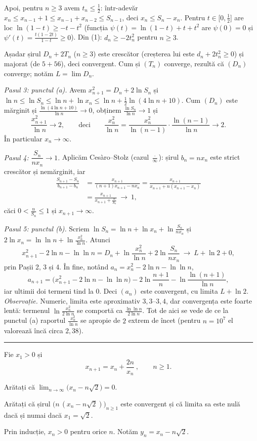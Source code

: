 Apoi, pentru $n\ge3$ avem $t_n\le\frac12$: într-adevăr $x_n\le x_{n-1}+1\le x_{n-1}+x_{n-2}\le S_{n-1}$, deci $x_n\le S_n-x_n$. Pentru $t\in\bigl[0,\frac12\bigr]$ are loc $\ln(1-t)\ge-t-t^2$ (funcția $\psi(t)=\ln(1-t)+t+t^2$ are $\psi(0)=0$ și $\psi'(t)=\frac{t(1-2t)}{1-t}\ge0$). Din (1): $d_n\ge-2t_n^2$ pentru $n\ge3$.

Așadar șirul $D_n+2T_n$ ($n\ge3$) este crescător (creșterea lui este $d_n+2t_n^2\ge0$) și majorat (de $5+56$), deci convergent. Cum și $(T_n)$ converge, rezultă că $(D_n)$ converge; notăm $L=\lim D_n$.

\emph{Pasul 3: punctul (a).} Avem $x_{n+1}^2=D_n+2\ln S_n$ și $\ln n\le\ln S_n\le\ln n+\ln x_n\le\ln n+\frac12\ln(4\ln n+10)$. Cum $(D_n)$ este mărginit și $\frac{\ln(4\ln n+10)}{\ln n}\to0$, obținem $\frac{\ln S_n}{\ln n}\to1$ și
\[ \frac{x_{n+1}^2}{\ln n}\to2 ,\qquad\text{deci}\qquad \frac{x_n^2}{\ln n}=\frac{x_n^2}{\ln(n-1)}\cdot\frac{\ln(n-1)}{\ln n}\to2 . \]
În particular $x_n\to\infty$.

\emph{Pasul 4: $\dfrac{S_n}{nx_n}\to1$.} Aplicăm Cesàro--Stolz (cazul $\frac{\cdot}{\infty}$): șirul $b_n=nx_n$ este strict crescător și nemărginit, iar
\[ \begin{aligned} \frac{S_{n+1}-S_n}{b_{n+1}-b_n}&=\frac{x_{n+1}}{(n+1)x_{n+1}-nx_n}=\frac{x_{n+1}}{x_{n+1}+n(x_{n+1}-x_n)}\\ &=\frac{x_{n+1}}{x_{n+1}+\frac{n}{S_n}}\ \longrightarrow\ 1, \end{aligned} \]
căci $0<\frac n{S_n}\le1$ și $x_{n+1}\to\infty$.

\emph{Pasul 5: punctul (b).} Scriem $\ln S_n=\ln n+\ln x_n+\ln\frac{S_n}{nx_n}$ și $2\ln x_n=\ln\ln n+\ln\frac{x_n^2}{\ln n}$. Atunci
\[ x_{n+1}^2-2\ln n-\ln\ln n=D_n+\ln\frac{x_n^2}{\ln n}+2\ln\frac{S_n}{nx_n}\ \longrightarrow\ L+\ln2+0 , \]
prin Pașii 2, 3 și 4. În fine, notând $a_n=x_n^2-2\ln n-\ln\ln n$,
\[ a_{n+1}=\bigl(x_{n+1}^2-2\ln n-\ln\ln n\bigr)-2\ln\frac{n+1}{n}-\ln\frac{\ln(n+1)}{\ln n}, \]
iar ultimii doi termeni tind la $0$. Deci $(a_n)$ este convergent, cu limita $L+\ln2$.\\[2pt]
\emph{Observație.} Numeric, limita este aproximativ $3{,}3$--$3{,}4$, dar convergența este foarte lentă: termenul $\ln\frac{x_n^2}{2\ln n}$ se comportă ca $\frac{\ln\ln n}{2\ln n}$. Tot de aici se vede de ce la punctul (a) raportul $\frac{x_n^2}{\ln n}$ se apropie de $2$ extrem de încet (pentru $n=10^7$ el valorează încă circa $2{,}38$).
\vspace{1mm}\hrule

Fie $x_1>0$ și
\[ x_{n+1}=x_n+\frac{2n}{x_n}\ ,\qquad n\ge1 . \]
\begin{parti}
  \item Arătați că $\displaystyle\lim_{n\to\infty}\bigl(x_n-n\sqrt2\bigr)=0$.
  \item Arătați că șirul $\bigl(n\,(x_n-n\sqrt2)\bigr)_{n\ge1}$ este convergent și că limita sa este nulă dacă și numai dacă $x_1=\sqrt2$.
\end{parti}
\sol Prin inducție, $x_n>0$ pentru orice $n$. Notăm $y_n=x_n-n\sqrt2$.

